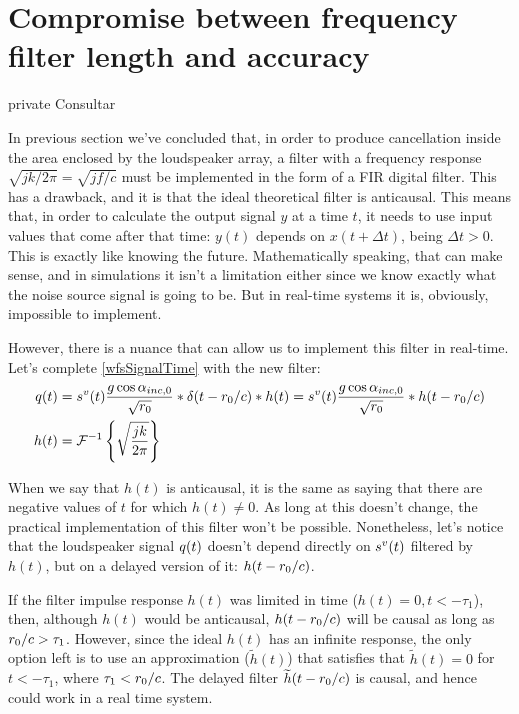 \section{Compromise between frequency filter length and accuracy}

\begin{shownto}{private}
	Consultar \cite{FrankSchutz2015}
\end{shownto}

In previous section we've concluded that, in order to produce cancellation inside the area enclosed by the loudspeaker array, a filter with a frequency response $\sqrt{jk/2\pi} = \sqrt{jf/c}$ must be implemented in the form of a FIR digital filter. This has a drawback, and it is that the ideal theoretical filter is anticausal. This means that, in order to calculate the output signal $y$ at a time $t$, it needs to use input values that come after that time: $y(t)$ depends on $x(t+\Delta t)$, being $\Delta t > 0$. This is exactly like knowing the future. Mathematically speaking, that can make sense, and in simulations it isn't a limitation either since we know exactly what the noise source signal is going to be.
But in real-time systems it is, obviously, impossible to implement.

However, there is a nuance that can allow us to implement this filter in real-time. Let's complete \autoref{wfsSignalTime} with the new filter:
\begin{equation}
\begin{aligned}
\signal[wfs][time](t) &= \signal[nsVirt][time](t) \frac{g \cos\normPrimaryPropAngleSection}{\sqrt{\distLinePrimSource}}
\ast\delta(t - \distLinePrimSource/c)\ast h(t) = \signal[nsVirt][time](t) \frac{g \cos\normPrimaryPropAngleSection}{\sqrt{\distLinePrimSource}}
\ast h(t - \distLinePrimSource/c)\\
h(t) &= \FourierTransform{\sqrt{\frac{jk}{2\pi}}}[inverse]
\end{aligned}
\end{equation}

When we say that $h(t)$ is anticausal, it is the same as saying that there are negative values of $t$ for which $h(t) \neq 0$. As long at this doesn't change, the practical implementation of this filter won't be possible. Nonetheless, let's notice that the loudspeaker signal $\signal[wfs][time](t)$ doesn't depend directly on $\signal[nsVirt][time](t)$ filtered by $h(t)$, but on a delayed version of it: $h(t - r_0/c)$.

If the filter impulse response $h(t)$ was limited in time ($h(t) = 0, t < -\tau_1$), then, although $h(t)$ would be anticausal, $h(t - r_0/c)$ will be causal as long as $r_0/c > \tau_1$. However, since the ideal $h(t)$ has an infinite response, the only option left is to use an approximation ($\widetilde{h}(t)$) that satisfies that $\widetilde{h}(t) = 0$ for $t < -\tau_1$, where $\tau_1 < r_0/c$. The delayed filter $\widetilde{h}(t - r_0/c)$ is causal, and hence could work in a real time system.

